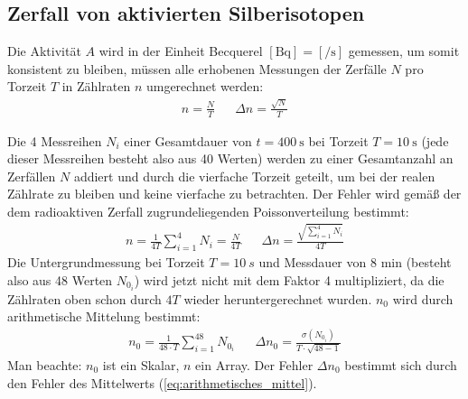 \clearpage
\subsection{Zerfall von aktivierten Silberisotopen}
Die Aktivität \(A\) wird in der Einheit Becquerel \([\unit{\becquerel}]=[\unit{\per\s}]\) gemessen, um somit konsistent zu bleiben, müssen alle erhobenen Messungen der Zerfälle \(N\) pro Torzeit \(T\) in Zählraten \(n\) umgerechnet werden:
\begin{align}
    n=\frac{N}{T}&&\Delta n=\frac{\sqrt{N}}{T}
\end{align}

Die 4 Messreihen \(N_i\) einer Gesamtdauer von \(t=\qty{400}{\s}\) bei Torzeit \(T=\qty{10}{\s}\) (jede dieser Messreihen besteht also aus 40 Werten) werden zu einer Gesamtanzahl an Zerfällen \(N\) addiert und durch die vierfache Torzeit geteilt, um bei der realen Zählrate zu bleiben und keine vierfache zu betrachten. Der Fehler wird gemäß der dem radioaktiven Zerfall zugrundeliegenden Poissonverteilung bestimmt:
\begin{align}
    n=\frac{1}{4T}\sum_{i=1}^{4} N_i=\frac{N}{4T} && \Delta n=\frac{\sqrt{\sum_{i=1}^{4} N_i}}{4T}
\end{align}
Die Untergrundmessung bei Torzeit \(T=\qty{10}{s}\) und Messdauer von 8 min (besteht also aus 48 Werten \(N_{0_i}\)) wird jetzt nicht mit dem Faktor 4 multipliziert, da die Zählraten oben schon durch \(4T\) wieder heruntergerechnet wurden. \(n_0\) wird durch arithmetische Mittelung bestimmt:
\begin{align}
    n_0=\frac{1}{48\cdot T}\sum_{i=1}^{48} N_{0_i}&&\Delta n_0=\frac{\sigma(N_{0_i})}{T\cdot\sqrt{48-1}}
\end{align} 
Man beachte: \(n_0\) ist ein Skalar, \(n\) ein Array. Der Fehler \(\Delta n_0\) bestimmt sich durch den Fehler des Mittelwerts (\cref{eq:arithmetisches_mittel}).

